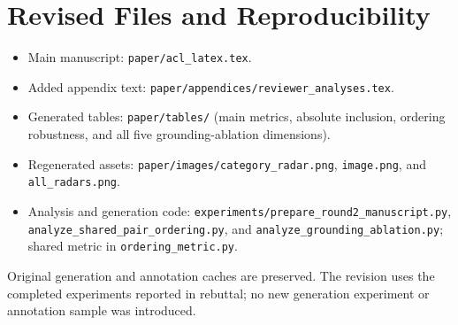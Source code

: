 \documentclass[11pt,a4paper]{article}
\begin{document}
\section*{Revised Files and Reproducibility}

\begin{itemize}
\item Main manuscript: \texttt{paper/acl\_latex.tex}.
\item Added appendix text: \texttt{paper/appendices/reviewer\_analyses.tex}.
\item Generated tables: \texttt{paper/tables/} (main metrics, absolute
inclusion, ordering robustness, and all five grounding-ablation dimensions).
\item Regenerated assets: \texttt{paper/images/category\_radar.png},
\texttt{image.png}, and \texttt{all\_radars.png}.
\item Analysis and generation code: \texttt{experiments/prepare\_round2\_manuscript.py},
\texttt{analyze\_shared\_pair\_ordering.py}, and
\texttt{analyze\_grounding\_ablation.py}; shared metric in
\texttt{ordering\_metric.py}.
\end{itemize}

Original generation and annotation caches are preserved. The revision
uses the completed experiments reported in rebuttal; no new generation
experiment or annotation sample was introduced.
\end{document}
